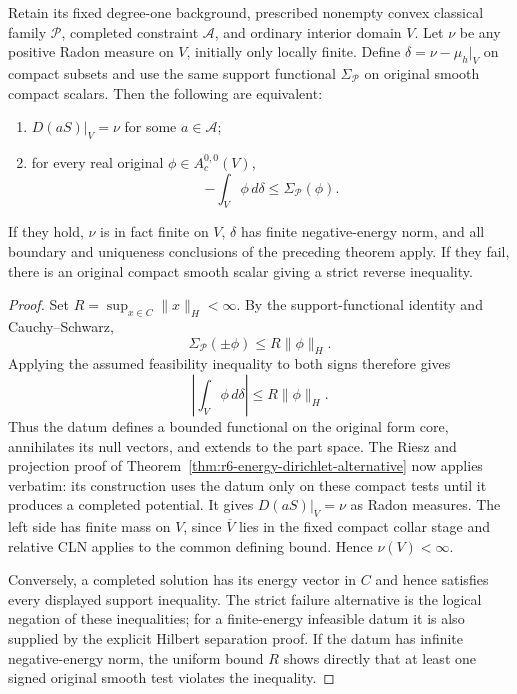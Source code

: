 \documentclass[11pt,a4paper]{article}
\numberwithin{equation}{section}
\theoremstyle{definition}
\theoremstyle{remark}
\begin{document}
Retain its fixed degree-one background, prescribed nonempty convex
classical family $\mathscr P$, completed constraint $\mathscr A$, and
ordinary interior domain $V$. Let $\nu$ be any positive Radon measure
on $V$, initially only locally finite. Define
$\delta=\nu-\mu_h|_V$ on compact subsets and use the same support
functional $\Sigma_{\mathscr P}$ on original smooth compact scalars.
Then the following are equivalent:
\begin{enumerate}
\item $D(aS)|_V=\nu$ for some $a\in\mathscr A$;
\item for every real original $\phi\in A_c^{0,0}(V)$,
\[
             -\int_V\phi\,d\delta\le\Sigma_{\mathscr P}(\phi).
\]
\end{enumerate}
If they hold, $\nu$ is in fact finite on $V$, $\delta$ has finite
negative-energy norm, and all boundary and uniqueness conclusions of
the preceding theorem apply. If they fail, there is an original compact
smooth scalar giving a strict reverse inequality.

\begin{proof}
Set $R=\sup_{x\in C}\|x\|_H<\infty$. By the support-functional
identity and Cauchy--Schwarz,
\[
                   \Sigma_{\mathscr P}(\pm\phi)\le R\|\phi\|_H.
\]
Applying the assumed feasibility inequality to both signs therefore
gives
\[
                    \left|\int_V\phi\,d\delta\right|
                                        \le R\|\phi\|_H.
\]
Thus the datum defines a bounded functional on the original form core,
annihilates its null vectors, and extends to the part space. The Riesz
and projection proof of Theorem~\ref{thm:r6-energy-dirichlet-alternative}
now applies verbatim: its construction uses the datum only on these
compact tests until it produces a completed potential. It gives
$D(aS)|_V=\nu$ as Radon measures. The left side has finite mass on
$V$, since $\overline V$ lies in the fixed compact collar stage and
relative CLN applies to the common defining bound. Hence $\nu(V)<\infty$.

Conversely, a completed solution has its energy vector in $C$ and hence
satisfies every displayed support inequality. The strict failure
alternative is the logical negation of these inequalities; for a
finite-energy infeasible datum it is also supplied by the explicit
Hilbert separation proof. If the datum has infinite negative-energy
norm, the uniform bound $R$ shows directly that at least one signed
original smooth test violates the inequality.
\end{proof}
\end{document}
